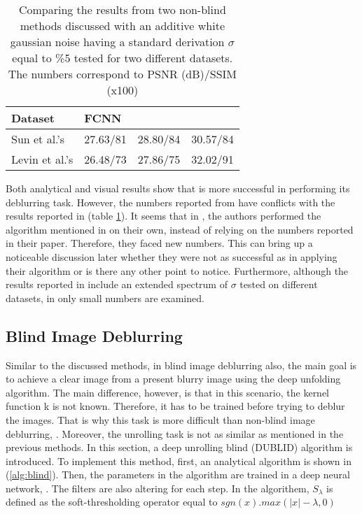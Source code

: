 \documentclass[conference, 11pt]{IEEEtran}
\begin{document}
	\begin{table}[h]
		\centering
		\begin{tabular}{|l|l|l|l|}
			\hline
			Dataset        & FCNN       & \cite{Quan2021}  & \cite{Nan2020} \\ \hline
			Sun et al.’s   & 27.63/81 & 28.80/84 & 30.57/84                \\ \hline
			Levin et al.’s & 26.48/73 & 27.86/75 & 32.02/91                \\ \hline
		\end{tabular}
		\label{tab:non-blind}
		\caption{Comparing the results from two non-blind methods discussed with an additive white gaussian noise having a standard derivation $\sigma$ equal to \%5 tested for two different datasets. The numbers correspond to PSNR (dB)/SSIM (x100)}
	\end{table}
	
	Both analytical and visual results show that \cite{Nan2020} is more successful in performing its deblurring task. However, the numbers reported from \cite{Quan2021} have conflicts with the results reported in (table \ref{tab:non-blind}). It seems that in \cite{Quan2021}, the authors performed the algorithm mentioned in \cite{Nan2020} on their own, instead of relying on the numbers reported in their paper. Therefore, they faced new numbers. This can bring up a noticeable discussion later whether they were not as successful as \cite{Nan2020} in applying their algorithm or is there any other point to notice. Furthermore, although the results reported in \cite{Nan2020} include an extended spectrum of $\sigma$ tested on different datasets, in \cite{Quan2021} only small numbers are examined. 
	
	\subsection{Blind Image Deblurring}
	
	Similar to the discussed methods, in blind image deblurring also, the main goal is to achieve a clear image from a present blurry image using the deep unfolding algorithm. The main difference, however, is that in this scenario, the kernel function k is not known. Therefore, it has to be trained before trying to deblur the images. That is why this task is more difficult than non-blind image deblurring, \cite{Monga2021}. Moreover, the unrolling task is not as similar as mentioned in the previous methods. In this section, a deep unrolling blind (DUBLID) algorithm is introduced. To implement this method, first, an analytical algorithm is shown in (\ref{alg:blind}). Then, the parameters in the algorithm are trained in a deep neural network, \cite{Li2020}. The filters are also altering for each step. In the algorithem, \(S_{\lambda}\) is defined as the soft-thresholding operator equal to \(sgn(x) . max(|x| - \lambda, 0)\)
	
\end{document}
